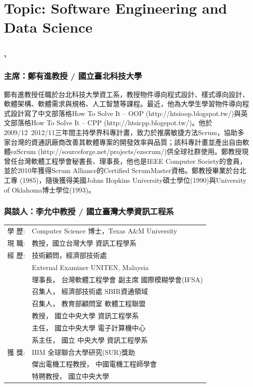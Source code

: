 \documentclass[12pt,oneside,a4paper]{book}
\newcommand{\mIndent}{\hspace{.5cm}}
\begin{document}
\section*{Topic: Software Engineering and Data Science}

\subsubsection*{\TimePanel, \LocationPanel}

\subsubsection*{主席：鄭有進教授 / 國立臺北科技大學}

\mIndent 鄭有進教授任職於台北科技大學資工系，教授物件導向程式設計、樣式導向設計、軟體架構、軟體需求與規格、人工智慧等課程。最近，他為大學生學習物件導向程式設計寫了中文部落格How To Solve It – OOP (http://htsioop.blogspot.tw/)與英文部落格How To Solve It – CPP (http://htsicpp.blogspot.tw/)。他於2009/12~2012/11三年間主持學界科專計畫，致力於推廣敏捷方法Scrum，協助多家台灣的資通訊廠商改善其軟體專案的開發效率與品質；該科專計畫並產出自由軟體ezScrum (http://sourceforge.net/projects/ezscrum/)供全球社群使用。鄭教授現曾任台灣軟體工程學會秘書長、理事長，他也是IEEE Computer Society的會員，並於2010年獲得Scrum Alliance的Certified ScrumMaster資格。鄭教授畢業於台北工專 (1985)，隨後獲得美國Johns Hopkins University碩士學位(1990)與University of Oklahoma博士學位(1993)。



\subsubsection*{與談人：李允中教授 / 國立臺灣大學資訊工程系}
\begin{tabular}{ll}
學 歷: & Computer Science 博士，Texas A\&M University\\
現 職: & 教授，國立台灣大學 資訊工程學系 \\
經 歷: & 技術顧問，經濟部技術處 \\
   & External Examiner UNITEN, Malaysia \\
   & 理事長， 台灣軟體工程學會 副主席 國際模糊學會(IFSA) \\
   & 召集人， 經濟部技術處 SBIR資通領域 \\
   & 召集人， 教育部顧問室 軟體工程聯盟 \\
   & 教授， 國立中央大學 資訊工程學系  \\
   & 主任， 國立中央大學 電子計算機中心 \\ 
   & 系主任， 國立   中央大學 資訊工程學系 \\
獲 獎: & IBM 全球聯合大學研究(SUR)獎助 \\ 
   & 傑出電機工程教授， 中國電機工程師學會 \\
   & 特聘教授， 國立中央大學 
\end{tabular}
\end{document}
